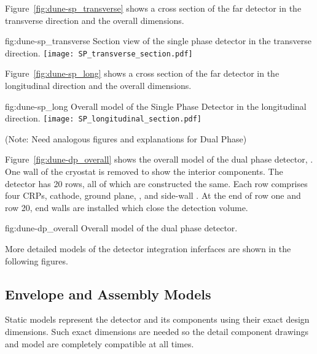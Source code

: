 Figure~\ref{fig:dune-sp_transverse} shows a cross section of the
 far detector in the transverse direction and the overall
dimensions.
\begin{dunefigure}{fig:dune-sp_transverse}
  {Section view of the single phase detector in the transverse
    direction.}
  \texttt{[image: SP\_transverse\_section.pdf]}
\end{dunefigure}
Figure~\ref{fig:dune-sp_long} shows a cross section of the
 far detector in the longitudinal direction and the overall
dimensions.
\begin{dunefigure}{fig:dune-sp_long}
  {Overall model of the Single Phase Detector in the longitudinal direction.}
  \texttt{[image: SP\_longitudinal\_section.pdf]}
\end{dunefigure}


(Note: Need analogous figures and explanations for Dual Phase)


Figure~\ref{fig:dune-dp_overall} shows the overall model of the dual
phase detector, . One wall of the cryostat is removed to show
the interior components. The detector has 20
rows, all of which are constructed the same. Each row comprises four
CRPs, cathode, ground plane, , and side-wall .  At the
end of row one and row 20, end walls are installed which close the
detection volume.
\begin{dunefigure}{fig:dune-dp_overall}
  {Overall model of the dual phase detector.}
\end{dunefigure}


More detailed models of the  detector integration inferfaces are shown in the following figures.


\subsection{Envelope and Assembly Models}
\label{sec:fdsp-coord-integ-envelope}
Static models represent the detector and its components using their exact
design dimensions. Such exact dimensions are needed so the
detail component drawings and model are completely compatible at all
times.


